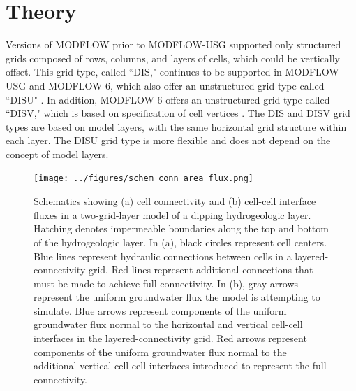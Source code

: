 \documentclass{article}
\begin{document}
\section{Theory}

Versions of MODFLOW prior to MODFLOW-USG \citep{modflowusg} supported only structured grids composed of rows, columns, and layers of cells, which could be vertically offset. This grid type, called ``DIS," continues to be supported in MODFLOW-USG and MODFLOW 6, which also offer an unstructured grid type called ``DISU" \citep{modflowusg, modflow6gwf}. In addition, MODFLOW 6 offers an  unstructured grid type called ``DISV," which is based on specification of cell vertices \citep{modflow6gwf}. The DIS and DISV grid types are based on model layers, with the same horizontal grid structure within each layer. The DISU grid type is more flexible and does not depend on the concept of model layers.

\begin{figure}
	\begin{center}
	\texttt{[image: ../figures/schem\_conn\_area\_flux.png]}
	\caption{Schematics showing (a) cell connectivity and (b) cell-cell interface fluxes in a two-grid-layer model of a dipping hydrogeologic layer. Hatching denotes impermeable boundaries along the top and bottom of the hydrogeologic layer. In (a), black circles represent cell centers. Blue lines represent hydraulic connections between cells in a layered-connectivity grid. Red lines represent additional connections that must be made to achieve full connectivity. In (b), gray arrows represent the uniform groundwater flux the model is attempting to simulate. Blue arrows represent components of the uniform groundwater flux normal to the horizontal and vertical cell-cell interfaces in the layered-connectivity grid. Red arrows represent components of the uniform groundwater flux normal to the additional vertical cell-cell interfaces introduced to represent the full connectivity.}
	\label{fig:schem-conn-area-flux}
	\end{center}
\end{figure}
\end{document}
